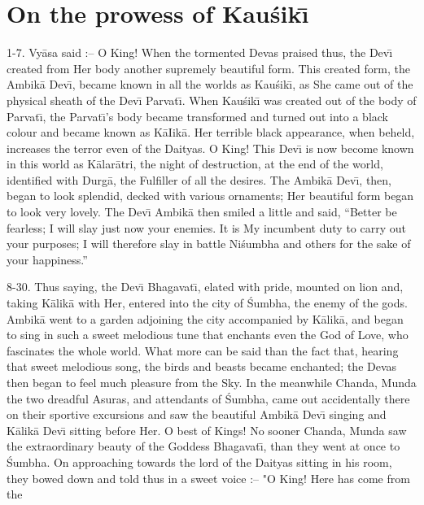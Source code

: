\chapter{On the prowess of Kau\'sik\={\i}}

1-7. Vy\=asa said :-- O King! When the tormented Devas praised thus, the Dev\={\i} created from Her body another supremely beautiful form. This created form, the Ambik\=a Dev\={\i}, became known in all the worlds as Kau\'sik\={\i}, as She came out of the physical sheath of the Dev\={\i} Parvat\={\i}. When Kau\'sik\={\i} was created out of the body of Parvat\={\i}, the Parvat\={\i}'s body became transformed and turned out into a black colour and became known as K\=aIik\=a. Her terrible black appearance, when beheld, increases the terror even of the Daityas. O King! This Dev\={\i} is now become known in this world as K\=alar\=atri, the night of destruction, at the end of the world, identified with Durg\=a, the Fulfiller of all the desires. The Ambik\=a Dev\={\i}, then, began to look splendid, decked with various ornaments; Her beautiful form began to look very lovely. The Dev\={\i} Ambik\=a then smiled a little and said, ``Better be fearless; I will slay just now your enemies. It is My incumbent duty to carry out your purposes; I will therefore slay in battle Ni\'sumbha and others for the sake of your happiness.''

8-30. Thus saying, the Dev\={\i} Bhagavat\={\i}, elated with pride, mounted on lion and, taking K\=alik\=a with Her, entered into the city of \'Sumbha, the enemy of the gods. Ambik\=a went to a garden adjoining the city accompanied by K\=alik\=a, and began to sing in such a sweet melodious tune that enchants even the God of Love, who fascinates the whole world. What more can be said than the fact that, hearing that sweet melodious song, the birds and beasts became enchanted; the Devas then began to feel much pleasure from the Sky. In the meanwhile Chanda, Munda the two dreadful Asuras, and attendants of \'Sumbha, came out accidentally there on their sportive excursions and saw the beautiful Ambik\=a Dev\={\i} singing and K\=alik\=a Dev\={\i} sitting before Her. O best of Kings! No sooner Chanda, Munda saw the extraordinary beauty of the Goddess Bhagavat\={\i}, than they went at once to \'Sumbha. On approaching towards the lord of the Daityas sitting in his room, they bowed down and told thus in a sweet voice :-- "O King! Here has come from the

